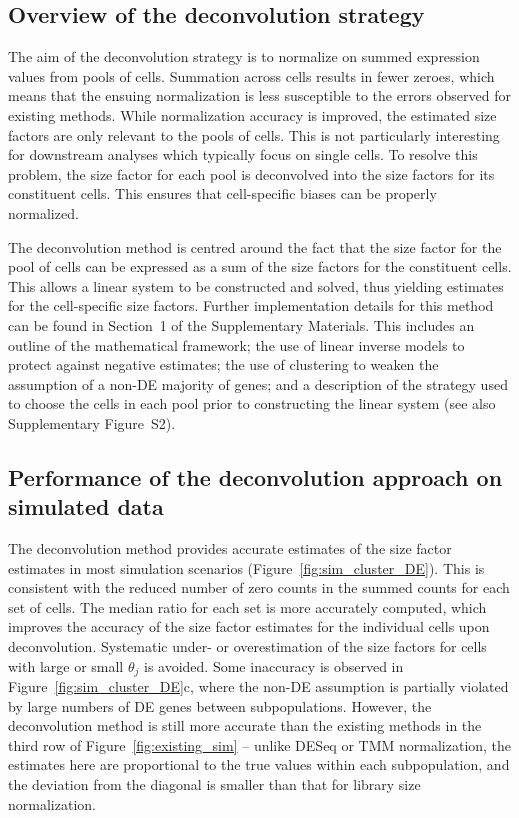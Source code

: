 \documentclass{bmcart}
\newcommand{\suppdeconv}{1}
\newcommand{\suppring}{S2}
\begin{document}
\subsection*{Overview of the deconvolution strategy}
The aim of the deconvolution strategy is to normalize on summed expression values from pools of cells.
Summation across cells results in fewer zeroes, which means that the ensuing normalization is less susceptible to the errors observed for existing methods.
While normalization accuracy is improved, the estimated size factors are only relevant to the pools of cells.
This is not particularly interesting for downstream analyses which typically focus on single cells.
To resolve this problem, the size factor for each pool is deconvolved into the size factors for its constituent cells.
This ensures that cell-specific biases can be properly normalized.

The deconvolution method is centred around the fact that the size factor for the pool of cells can be expressed as a sum of the size factors for the constituent cells.
This allows a linear system to be constructed and solved, thus yielding estimates for the cell-specific size factors.
Further implementation details for this method can be found in Section~\suppdeconv{} of the Supplementary Materials.
This includes an outline of the mathematical framework; 
    the use of linear inverse models to protect against negative estimates;
    the use of clustering to weaken the assumption of a non-DE majority of genes;
    and a description of the strategy used to choose the cells in each pool prior to constructing the linear system (see also Supplementary Figure~\suppring{}).

\subsection*{Performance of the deconvolution approach on simulated data}
The deconvolution method provides accurate estimates of the size factor estimates in most simulation scenarios (Figure~\ref{fig:sim_cluster_DE}).
This is consistent with the reduced number of zero counts in the summed counts for each set of cells.
The median ratio for each set is more accurately computed, which improves the accuracy of the size factor estimates for the individual cells upon deconvolution.
Systematic under- or overestimation of the size factors for cells with large or small $\theta_j$ is avoided.
Some inaccuracy is observed in Figure~\ref{fig:sim_cluster_DE}c, where the non-DE assumption is partially violated by large numbers of DE genes between subpopulations.
However, the deconvolution method is still more accurate than the existing methods in the third row of Figure~\ref{fig:existing_sim}
    -- unlike DESeq or TMM normalization, the estimates here are proportional to the true values within each subpopulation, 
       and the deviation from the diagonal is smaller than that for library size normalization.
\end{document}
